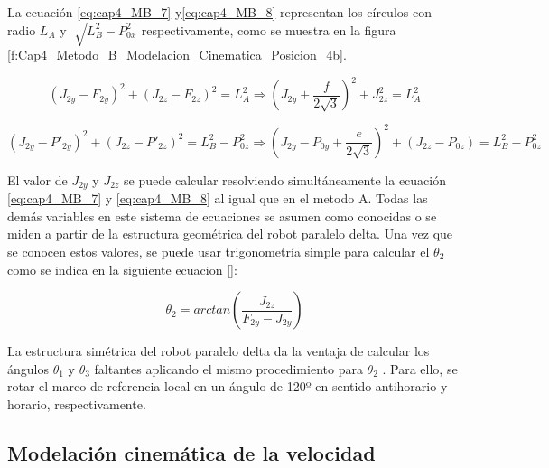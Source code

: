      \newpage

      La ecuación \ref{eq:cap4_MB_7} y\ref{eq:cap4_MB_8} representan los círculos con radio  \( L_{A} \)  y  \( \sqrt[]{L_{B}^{2}-P_{0x}^{2}} \)  respectivamente, como se muestra en la figura \ref{f:Cap4_Metodo_B_Modelacion_Cinematica_Posicion_4b}.
  
  
        \begin{equation}
              (J_{2y}-F_{2y})^2 + (J_{2z}-F_{2z})^2=  L_{A}^{2}  \Rightarrow  \left (J_{2y} + \frac{f}{2\sqrt{3}}\right)^2 + J_{2z}^{2}= L_{A}^{2}
        \label{eq:cap4_MB_7}
        \end{equation}
        
        
        \begin{equation} 
              (J_{2y}-{P'}_{2y})^2 + (J_{2z}-{P'}_{2z})^2= L_{B}^{2} -P_{0z}^2  \Rightarrow   \left (J_{2y} - P_{0y}+ \frac{e}{2\sqrt{3}}\right)^2 + ({J}_{2z}-{P}_{0z}) = L_{B}^{2} -P_{0z}^2
        \label{eq:cap4_MB_8}
        \end{equation}  
    
    
        El valor de  \( J_{2y} \)  y  \( J_{2z} \)  se puede calcular resolviendo simultáneamente la ecuación \ref{eq:cap4_MB_7} y \ref{eq:cap4_MB_8} al igual que en el metodo A. Todas las demás variables en este sistema de ecuaciones se asumen como conocidas o se miden a partir de la estructura geométrica del robot paralelo delta. Una vez que se conocen estos valores, se puede usar trigonometría simple para calcular el  \(  \theta _{2} \)  como se indica en la siguiente ecuacion \ref{}:
        
        \begin{equation} 
            \theta_2=arctan \left(\frac{J_{2z}}{{F}_{2y}-{J}_{2y}}\right)
        \label{eq:cap4_MB_9}
        \end{equation}  
   
   
        La estructura simétrica del robot paralelo delta da la ventaja de calcular los ángulos  \(  \theta _{1} \)  y  \(  \theta _{3} \)  faltantes aplicando el mismo procedimiento para  \(  \theta _{2} \) . Para ello, se rotar el marco de referencia local en un ángulo de 120º en sentido antihorario y horario, respectivamente.   
           
     
        \newpage

\subsection{Modelación cinemática de la velocidad}\label{mb_cvel}
    
